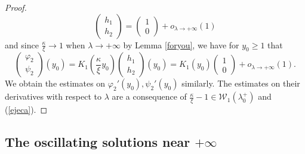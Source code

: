 \documentclass[11 pt]{amsart}
\theoremstyle{definition}
\theoremstyle{remark}
\numberwithin{equation}{section}
\begin{document}
\begin{proof}
  \[ \left(\begin{array}{c}
       h_1\\
       h_2
     \end{array}\right) = \left(\begin{array}{c}
       1\\
       0
     \end{array}\right) + o_{\lambda \rightarrow + \infty} (1) \]
  and since $\frac{\kappa}{\xi} \rightarrow 1$ when $\lambda \rightarrow +
  \infty$ by Lemma \ref{foryou}, we have for $y_0 \geqslant 1$ that
  \[ \left(\begin{array}{c}
       \varphi_2\\
       \psi_2
     \end{array}\right) (y_0) = K_1 \left( \frac{\kappa}{\xi} y_0 \right)
     \left(\begin{array}{c}
       h_1\\
       h_2
     \end{array}\right) (y_0) = K_1 (y_0) \left(\begin{array}{c}
       1\\
       0
     \end{array}\right) + o_{\lambda \rightarrow + \infty} (1) . \]
  We obtain the estimates on $\varphi_2' (y_0), \psi_2' (y_0)$ similarly. The
  estimates on their derivatives with respect to $\lambda$ are a consequence
  of $\frac{\kappa}{\xi} - 1 \in \mathcal{W}_1 (\lambda_0^+)$ and
  (\ref{ejeca}).
\end{proof}
\subsection{The oscillating solutions near $ + \infty$}
\end{document}
